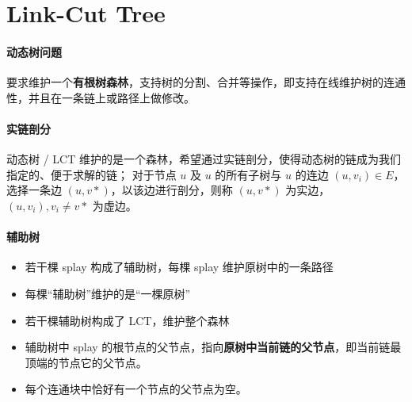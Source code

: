 \section{Link-Cut Tree}

\paragraph{动态树问题}

\par 要求维护一个\textbf{有根树森林}，支持树的分割、合并等操作，即支持在线维护树的连通性，并且在一条链上或路径上做修改。

\paragraph{实链剖分}

\par 动态树 / LCT 维护的是一个森林，希望通过实链剖分，使得动态树的链成为我们指定的、便于求解的链；
对于节点 $u$ 及 $u$ 的所有子树与 $u$ 的连边 $(u, v_i) \in E$，选择一条边 $(u, v*)$，以该边进行剖分，则称 $(u, v*)$ 为实边，$(u, v_i), v_i \neq v*$ 为虚边。

\paragraph{辅助树}

\begin{itemize}
\item 若干棵 splay 构成了辅助树，每棵 splay 维护原树中的一条路径
\item 每棵“辅助树”维护的是“一棵原树”
\item 若干棵辅助树构成了 LCT，维护整个森林
\item 辅助树中 splay 的根节点的父节点，指向\textbf{原树中当前链的父节点}，即当前链最顶端的节点它的父节点。
\item 每个连通块中恰好有一个节点的父节点为空。
\end{itemize}

